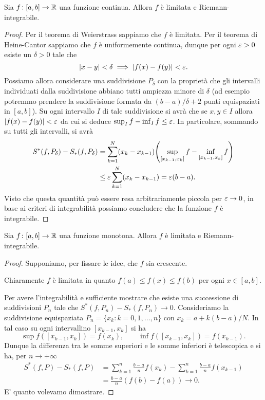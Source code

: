 \begin{theorem}
\mymark{***}
\label{th:integrabilita_continue}
Sia $f\colon [a,b]\to \mathbb R$ una funzione continua.
Allora $f$ è limitata e Riemann-integrabile.
\end{theorem}
%
\begin{proof}
\mymark{***}
Per il teorema di Weierstrass sappiamo che $f$ è limitata.
Per il teorema di Heine-Cantor sappiamo che $f$ è uniformemente continua,
dunque per ogni $\varepsilon>0$ esiste un $\delta>0$ tale che
\[
 {\left|x-y\right|} < \delta \implies {\left|f(x)-f(y)\right|} < \varepsilon.
\]
Possiamo allora considerare una suddivisione $P_\delta$ con la proprietà che
gli intervalli individuati dalla suddivisione abbiano tutti ampiezza minore di
$\delta$ (ad esempio potremmo prendere la suddivisione formata da
$(b-a)/\delta+2$ punti equispaziati in $[a,b]$). Su ogni intervallo $I$ di tale
suddivisione si avrà che se $x,y\in I$ allora ${\left|f(x)-f(y)\right|} < \varepsilon$ da cui
si deduce $\sup_I f - \inf_I f \le \varepsilon$.
In particolare, sommando su tutti gli intervalli, si avrà
\begin{align*}
  S^*(f,P_\delta) - S_*(f,P_\delta)
  &= \sum_{k=1}^N (x_k-x_{k-1}){\left( \sup_{[x_{k-1},x_k]} f - \inf_{[x_{k-1},x_k]} f \right)} \\
  &\le \varepsilon \sum_{k=1}^N (x_k - x_{k-1})
   = \varepsilon (b-a).
\end{align*}
Visto che questa quantità può essere resa arbitrariamente piccola per
$\varepsilon \to 0$, in base ai criteri di integrabilità possiamo concludere che la
funzione $f$ è integrabile.
\end{proof}

\begin{theorem}
\label{th:integrabilita_monotone}%
%
%
Sia $f\colon [a,b]\to \mathbb R$ una funzione monotona. Allora $f$ è limitata e
Riemann-integrabile.
\end{theorem}
%
\begin{proof}
Supponiamo, per fissare le idee, che $f$ sia crescente.

Chiaramente $f$ è limitata in quanto $f(a) \le f(x) \le f(b)$ per ogni
$x\in [a,b]$.

Per avere l'integrabilità e sufficiente mostrare
che esiste una successione di suddivisioni $P_n$
tale che $S^*(f,P_n) - S_*(f,P_n) \to 0$.
Consideriamo la suddivisione equispaziata
$P_n=\{x_k \colon k=0,1, \dots, n\}$ con $x_k=a+k(b-a)/N$.
In tal caso su ogni intervallino $[x_{k-1},x_k]$ si ha
\[
  \sup f([x_{k-1}, x_k]) = f(x_k),
  \qquad
  \inf f([x_{k-1}, x_k]) = f(x_{k-1}).
\]
Dunque la differenza tra le somme superiori
e le somme inferiori è telescopica
e si ha, per $n\to +\infty$
\begin{align*}
S^*(f,P) - S_*(f,P)
&= \sum_{k=1}^n \frac{b-a}{n} f(x_k)
  - \sum_{k=1}^n \frac{b-a}{n} f(x_{k-1}) \\
&= \frac{b-a}{n}(f(b)-f(a)) \to 0.
\end{align*}
E' quanto volevamo dimostrare.
\end{proof}

